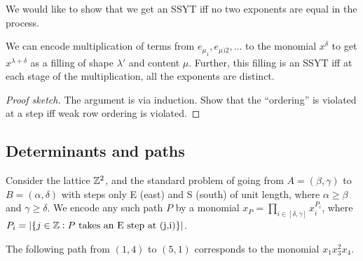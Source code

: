 	We would like to show that we get an SSYT iff no two exponents are equal in the process.

	\begin{flem}
		We can encode multiplication of terms from $e_{\mu_1},e_{\mu)2},\ldots$ to the monomial $x^\delta$ to get $x^{\lambda+\delta}$ as a filling of shape $\lambda'$ and content $\mu$. Further, this filling is an SSYT iff at each stage of the multiplication, all the exponents are distinct.
	\end{flem}
	\begin{proof}[Proof sketch]
		The argument is via induction. Show that the ``ordering'' is violated at a step iff weak row ordering is violated.
	\end{proof}

\subsection{Determinants and paths}

	Consider the lattice $\mathbb{Z}^2$, and the standard problem of going from $A = (\beta,\gamma)$ to $B = (\alpha,\delta)$ with steps only E (east) and S (south) of unit length, where $\alpha \ge \beta$ and $\gamma \ge \delta$. We encode any such path $P$ by a monomial $x_P = \prod_{i \in [\delta,\gamma]} x_i^{P_i}$, where $P_i = |\{ j \in \mathbb{Z} : \text{$P$ takes an E step at (j,i)} \}|$.\\

	\begin{fex}
		The following path from $(1,4)$ to $(5,1)$ corresponds to the monomial $x_1x_3^2x_4$.
		\begin{center}
		\end{center}
	\end{fex}


